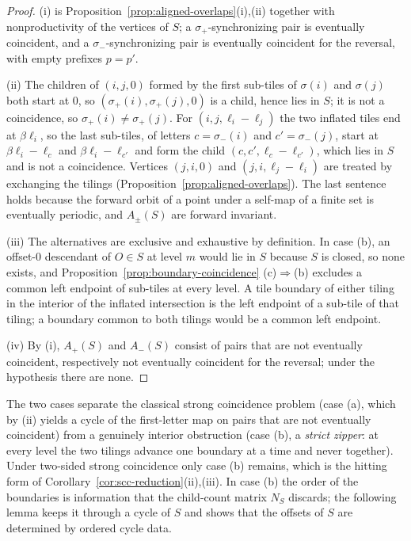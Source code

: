 \documentclass[11pt]{amsart}
\theoremstyle{plain}
\theoremstyle{definition}
\theoremstyle{remark}
\begin{document}
\begin{proof}
(i) is Proposition~\ref{prop:aligned-overlaps}(i),(ii) together with nonproductivity of the vertices of $S$; a $\sigma_+$-synchronizing pair is eventually coincident, and a $\sigma_-$-synchronizing pair is eventually coincident for the reversal, with empty prefixes $p=p'$.

(ii) The children of $(i,j,0)$ formed by the first sub-tiles of $\sigma(i)$ and $\sigma(j)$ both start at $0$, so $(\sigma_+(i),\sigma_+(j),0)$ is a child, hence lies in $S$; it is not a coincidence, so $\sigma_+(i)\ne\sigma_+(j)$. For $(i,j,\ell_i-\ell_j)$ the two inflated tiles end at $\beta\ell_i$, so the last sub-tiles, of letters $c=\sigma_-(i)$ and $c'=\sigma_-(j)$, start at $\beta\ell_i-\ell_c$ and $\beta\ell_i-\ell_{c'}$ and form the child $(c,c',\ell_c-\ell_{c'})$, which lies in $S$ and is not a coincidence. Vertices $(j,i,0)$ and $(j,i,\ell_j-\ell_i)$ are treated by exchanging the tilings (Proposition~\ref{prop:aligned-overlaps}). The last sentence holds because the forward orbit of a point under a self-map of a finite set is eventually periodic, and $A_\pm(S)$ are forward invariant.

(iii) The alternatives are exclusive and exhaustive by definition. In case (b), an offset-$0$ descendant of $O\in S$ at level $m$ would lie in $S$ because $S$ is closed, so none exists, and Proposition~\ref{prop:boundary-coincidence} (c)$\Rightarrow$(b) excludes a common left endpoint of sub-tiles at every level. A tile boundary of either tiling in the interior of the inflated intersection is the left endpoint of a sub-tile of that tiling; a boundary common to both tilings would be a common left endpoint.

(iv) By (i), $A_+(S)$ and $A_-(S)$ consist of pairs that are not eventually coincident, respectively not eventually coincident for the reversal; under the hypothesis there are none.
\end{proof}

The two cases separate the classical strong coincidence problem (case (a), which by (ii) yields a cycle of the first-letter map on pairs that are not eventually coincident) from a genuinely interior obstruction (case (b), a \emph{strict zipper}: at every level the two tilings advance one boundary at a time and never together). Under two-sided strong coincidence only case (b) remains, which is the hitting form of Corollary~\ref{cor:scc-reduction}(ii),(iii). In case (b) the order of the boundaries is information that the child-count matrix $N_S$ discards; the following lemma keeps it through a cycle of $S$ and shows that the offsets of $S$ are determined by ordered cycle data.
\end{document}
